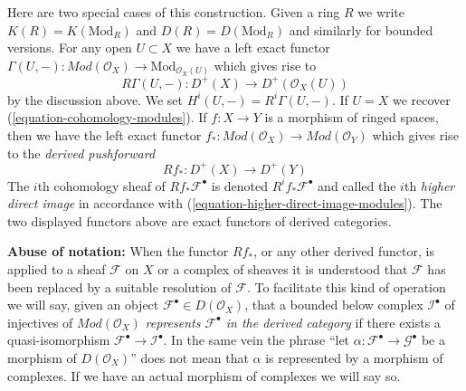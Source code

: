 \medskip\noindent
Here are two special cases of this construction.
Given a ring $R$ we write $K(R) = K(\text{Mod}_R)$ and
$D(R) = D(\text{Mod}_R)$ and similarly for bounded versions.
For any open $U \subset X$ we have a left exact functor
$
\Gamma(U, -) :
\textit{Mod}(\mathcal{O}_X)
\longrightarrow
\text{Mod}_{\mathcal{O}_X(U)}
$
which gives rise to
\begin{equation}
\label{equation-total-derived-cohomology}
R\Gamma(U, -) :
D^{+}(X)
\longrightarrow
D^{+}(\mathcal{O}_X(U))
\end{equation}
by the discussion above. We set $H^i(U, -) = R^i\Gamma(U, -)$.
If $U = X$ we recover (\ref{equation-cohomology-modules}).
If $f : X \to Y$ is a morphism of ringed spaces, then we have
the left exact functor
$
f_* :
\textit{Mod}(\mathcal{O}_X)
\longrightarrow
\textit{Mod}(\mathcal{O}_Y)
$
which gives rise to the {\it derived pushforward}
\begin{equation}
\label{equation-total-derived-direct-image}
Rf_* :
D^{+}(X)
\longrightarrow
D^{+}(Y)
\end{equation}
The $i$th cohomology sheaf of $Rf_*\mathcal{F}^\bullet$ is denoted
$R^if_*\mathcal{F}^\bullet$ and called the $i$th {\it higher direct image}
in accordance with (\ref{equation-higher-direct-image-modules}).
The two displayed functors above are exact functors
of derived categories.

\medskip\noindent
{\bf Abuse of notation:} When the functor $Rf_*$, or any other
derived functor, is applied to a sheaf $\mathcal{F}$ on $X$ or a complex
of sheaves it is understood that $\mathcal{F}$ has been replaced by a
suitable resolution of $\mathcal{F}$. To facilitate this kind of
operation we will say, given an object
$\mathcal{F}^\bullet \in D(\mathcal{O}_X)$,
that a bounded below complex $\mathcal{I}^\bullet$ of injectives of
$\textit{Mod}(\mathcal{O}_X)$
{\it represents $\mathcal{F}^\bullet$ in the derived category}
if there exists a quasi-isomorphism
$\mathcal{F}^\bullet \to \mathcal{I}^\bullet$. In the same vein the phrase
``let $\alpha : \mathcal{F}^\bullet \to \mathcal{G}^\bullet$ be
a morphism of $D(\mathcal{O}_X)$''
does not mean that $\alpha$ is represented by a
morphism of complexes. If we have an actual morphism of complexes we will
say so.


